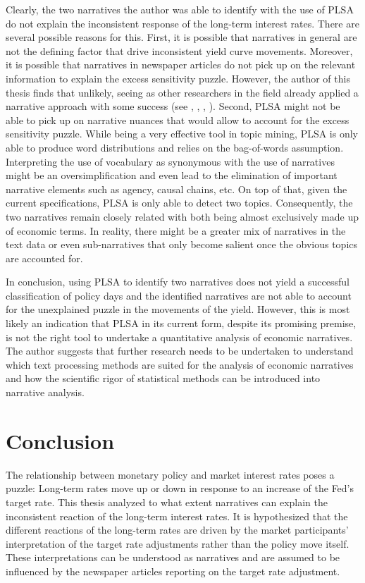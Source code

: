 \documentclass[11pt,a4paper,english,oneside]{book}
\numberwithin{equation}{chapter}
\begin{document}
Clearly, the two narratives the author was able to identify with the use of PLSA do not explain the inconsistent response of the long-term interest rates. There are several possible reasons for this. First, it is possible that narratives in general are not the defining factor that drive inconsistent yield curve movements. Moreover, it is possible that narratives in newspaper articles do not pick up on the relevant information to explain the excess sensitivity puzzle. However, the author of this thesis finds that unlikely, seeing as other researchers in the field already applied a narrative approach with some success (see \cite{Ellingsen.2003}, \cite{Cook.1989}, \cite{Goetzmann.2016}, \cite{Gurkaynak.2004}). Second, PLSA might not be able to pick up on narrative nuances that would allow to account for the excess sensitivity puzzle. While being a very effective tool in topic mining, PLSA is only able to produce word distributions and relies on the bag-of-words assumption. Interpreting the use of vocabulary as synonymous with the use of narratives might be an oversimplification and even lead to the elimination of important narrative elements such as agency, causal chains, etc. On top of that, given the current specifications, PLSA is only able to detect two topics. Consequently, the two narratives remain closely related with both being almost exclusively made up of economic terms. In reality, there might be a greater mix of narratives in the text data or even sub-narratives that only become salient once the obvious topics are accounted for.

In conclusion, using PLSA to identify two narratives does not yield a successful classification of policy days and the identified narratives are not able to account  for the unexplained puzzle in the movements of the yield. However, this is most likely an indication that PLSA in its current form, despite its promising premise, is not the right tool to undertake a quantitative analysis of economic narratives. The author suggests that further research needs to be undertaken to understand which text processing methods are suited for the analysis of economic narratives and how the scientific rigor of statistical methods can be introduced into narrative analysis. 


\chapter{Conclusion}


The relationship between monetary policy and market interest rates poses a puzzle: Long-term rates move up or down in response to an increase of the Fed's target rate. This thesis analyzed to what extent narratives can explain the inconsistent reaction of the long-term interest rates. It is hypothesized that the different reactions of the long-term rates are driven by the market participants' interpretation of the target rate adjustments rather than the policy move itself. These interpretations can be understood as narratives and are assumed to be influenced by the newspaper articles reporting on the target rate adjustment. 
\end{document}
